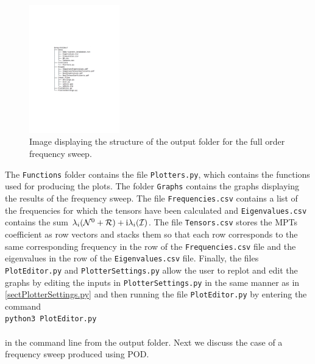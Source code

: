 \begin{figure}[H]
\begin{center}
\includegraphics[width=0.35\textwidth]{Figures/FullOutput}
\caption{Image displaying the structure of the output folder for the full order frequency sweep.}\label{fig:FullOrderOutput}
\end{center}
\end{figure}
\noindent
The \texttt{Functions} folder contains the file \texttt{Plotters.py}, which contains the functions used for producing the plots. The folder \texttt{Graphs} contains the graphs displaying the results of the frequency sweep. The file \texttt{Frequencies.csv} contains a list of the frequencies for which the tensors have been calculated and  \texttt{Eigenvalues.csv} contains the sum  $\lambda_i(\mathcal{N}^0+\mathcal{R})+\mathrm{i}\lambda_i(\mathcal{I})$. The file \texttt{Tensors.csv} stores the MPTs coefficient as row vectors and stacks them so that each row corresponds to the same corresponding frequency in the row of the \texttt{Frequencies.csv} file and the eigenvalues in the row of the \texttt{Eigenvalues.csv} file. Finally, the files \texttt{PlotEditor.py} and \texttt{PlotterSettings.py}  allow the user to replot and edit the graphs by editing the inputs in \texttt{PlotterSettings.py} in the same manner as in \ref{sectPlotterSettings.py} and then running the file \texttt{PlotEditor.py}  by entering the command\\

\noindent \texttt{python3 PlotEditor.py}\\
\\
in the command line from the output folder. Next we discuss the case of a frequency sweep produced using POD.\\
